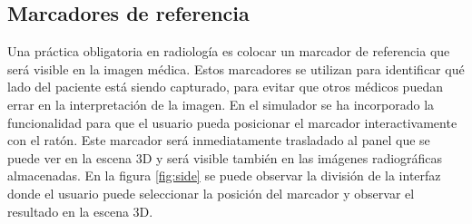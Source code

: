 \subsection{Marcadores de referencia}
\label{xray:sidemark}
Una práctica obligatoria en radiología es colocar un marcador de referencia que será visible en la imagen médica. Estos marcadores se utilizan para identificar qué lado del paciente está siendo capturado, para evitar que otros médicos puedan errar en la interpretación de la imagen. En el simulador se ha incorporado la funcionalidad para que el usuario pueda posicionar el marcador interactivamente con el ratón. Este marcador será inmediatamente trasladado al panel que se puede ver en la escena 3D y será visible también en las imágenes radiográficas almacenadas. En la figura \ref{fig:side} se puede observar la división de la interfaz donde el usuario puede seleccionar la posición del marcador y observar el resultado en la escena 3D. 

